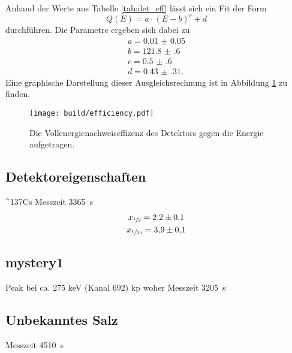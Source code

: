 Anhand der Werte aus Tabelle \ref{tab:det_eff} lässt sich ein Fit der Form
\begin{equation}
  Q(E) = a \cdot \left(E-b \right)^c + d
\end{equation}
durchführen. Die Parametre ergeben sich dabei zu
\begin{gather}
  a = \num{0.01(5)} \\
  b = \num{121.8(6)} \\
  c = \num{0.5(6)} \\
  d = \num{0.43(31)}.
\end{gather}
Eine graphische Darstellung dieser Ausgleichsrechnung ist in Abbildung \ref{fig:effizenz} zu finden.

\begin{figure}
 \centering
 \texttt{[image: build/efficiency.pdf]}
 \caption{Die Vollenergienachweiseffizenz des Detektors gegen die Energie aufgetragen.}
 \label{fig:effizenz}
\end{figure}




\subsection{Detektoreigenschaften}
\label{sec:Detektoreigenschaften}
{}^{137}Cs Messzeit \SI{3365}{\second}
\begin{gather}
  x_{\sfrac{1}{2}} = \num{2.2(1)} \\
  x_{\sfrac{1}{10}} = \num{3.9(1)}
\end{gather}


\subsection{mystery1}
\label{sec:}
Peak bei ca. 275 keV (Kanal 692) kp woher
Messzeit \SI{3205}{\second}

\subsection{Unbekanntes Salz}
\label{sec:Salz}
Messzeit \SI{4510}{\second}


